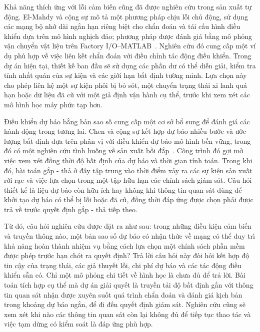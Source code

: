 Khả năng thích ứng với lỗi cảm biến cũng đã được nghiên cứu trong sản xuất tự động. El-Mahdy và cộng sự mô tả một phương pháp chịu lỗi chủ động, sử dụng các mạng bộ nhớ dài ngắn hạn riêng biệt cho chẩn đoán và tái cấu hình điều khiển dựa trên mô hình nghịch đảo; phương pháp được đánh giá bằng mô phỏng vận chuyển vật liệu trên Factory I/O--MATLAB~\cite{ElMahdy2024}. Nghiên cứu đó cung cấp một ví dụ phù hợp về việc liên kết chẩn đoán với điều chỉnh tác động điều khiển. Trong dự án hiện tại, thiết kế ban đầu sẽ sử dụng các phần dư có thể diễn giải, kiểm tra tính nhất quán của sự kiện và các giới hạn bất định tường minh. Lựa chọn này cho phép liên hệ một sự kiện phôi bị bỏ sót, một chuyển trạng thái xi lanh quá hạn hoặc dữ liệu đã cũ với một giả định vận hành cụ thể, trước khi xem xét các mô hình học máy phức tạp hơn.

Điều khiển dự báo bằng bản sao số cung cấp một cơ sở bổ sung để đánh giá các hành động trong tương lai. Chen và cộng sự kết hợp dự báo nhiều bước và ước lượng bất định dựa trên phân vị với điều khiển dự báo mô hình bền vững, trong đó có một nghiên cứu tình huống về sản xuất bồi đắp~\cite{Chen2026}. Công trình đó gợi mở việc xem xét đồng thời độ bất định của dự báo và thời gian tính toán. Trong khi đó, bài toán gắp - thả ở đây tập trung vào thời điểm xảy ra các sự kiện sản xuất rời rạc và việc lựa chọn trong một tập hữu hạn các chính sách giám sát. Câu hỏi thiết kế là liệu dự báo còn hữu ích hay không khi thông tin quan sát dùng để khởi tạo dự báo có thể bị lỗi hoặc đã cũ, đồng thời đáp ứng được chọn phải được trả về trước quyết định gắp - thả tiếp theo.

Từ đó, câu hỏi nghiên cứu được đặt ra như sau: trong những điều kiện cảm biến và truyền thông nào, một bản sao số dự báo có nhận thức về mạng có thể duy trì khả năng hoàn thành nhiệm vụ bằng cách lựa chọn một chính sách phần mềm được phép trước hạn chót ra quyết định? Trả lời câu hỏi này đòi hỏi kết hợp độ tin cậy của trạng thái, các giả thuyết lỗi, chi phí dự báo và các tác động điều khiển sẵn có. Chỉ một mô phỏng chi tiết về hình học là chưa đủ để trả lời. Bài toán tích hợp cụ thể mà dự án giải quyết là truyền tải độ bất định gắn với thông tin quan sát nhận được xuyên suốt quá trình chẩn đoán và đánh giá kịch bản trong khoảng dự báo ngắn, để đi đến quyết định giám sát. Nghiên cứu cũng sẽ xem xét khi nào các thông tin quan sát còn lại không đủ để tiếp tục thao tác và việc tạm dừng có kiểm soát là đáp ứng phù hợp.

